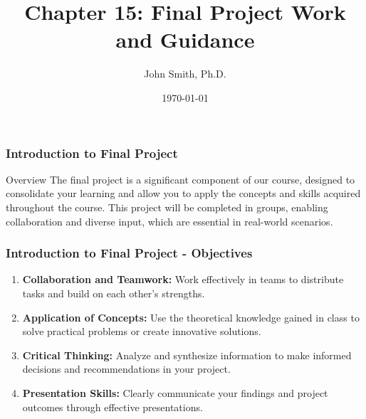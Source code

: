 \documentclass[aspectratio=169]{beamer}
\title[Final Project Work and Guidance]{Chapter 15: Final Project Work and Guidance}
\author[J. Smith]{John Smith, Ph.D.}
\institute[University Name]{
  Department of Computer Science\\
  University Name\\
  \vspace{0.3cm}
  Email: email@university.edu\\
  Website: www.university.edu
}
\date{\today}
\begin{document}
\frame{\titlepage}

\begin{frame}[fragile]
    \frametitle{Introduction to Final Project}
    \begin{block}{Overview}
        The final project is a significant component of our course, designed to consolidate your learning and allow you to apply the concepts and skills acquired throughout the course. This project will be completed in groups, enabling collaboration and diverse input, which are essential in real-world scenarios.
    \end{block}
\end{frame}

\begin{frame}[fragile]
    \frametitle{Introduction to Final Project - Objectives}
    \begin{enumerate}
        \item \textbf{Collaboration and Teamwork:} 
        Work effectively in teams to distribute tasks and build on each other’s strengths.
        
        \item \textbf{Application of Concepts:} 
        Use the theoretical knowledge gained in class to solve practical problems or create innovative solutions.
        
        \item \textbf{Critical Thinking:} 
        Analyze and synthesize information to make informed decisions and recommendations in your project.
        
        \item \textbf{Presentation Skills:} 
        Clearly communicate your findings and project outcomes through effective presentations.
    \end{enumerate}
\end{frame}
\end{document}
